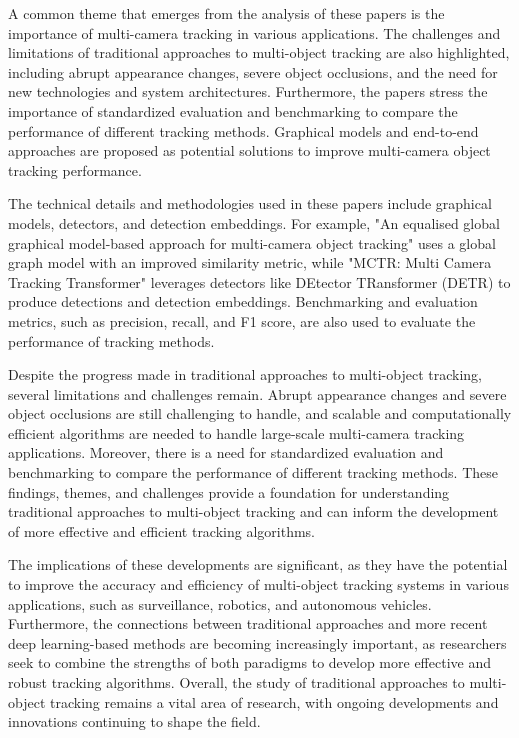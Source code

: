 \documentclass[conference]{IEEEtran}
\begin{document}
A common theme that emerges from the analysis of these papers is the importance of multi-camera tracking in various applications. The challenges and limitations of traditional approaches to multi-object tracking are also highlighted, including abrupt appearance changes, severe object occlusions, and the need for new technologies and system architectures. Furthermore, the papers stress the importance of standardized evaluation and benchmarking to compare the performance of different tracking methods. Graphical models and end-to-end approaches are proposed as potential solutions to improve multi-camera object tracking performance.

The technical details and methodologies used in these papers include graphical models, detectors, and detection embeddings. For example, "An equalised global graphical model-based approach for multi-camera object tracking" \cite{An equalised global graphical model-based approach for multi-camera object tracking} uses a global graph model with an improved similarity metric, while "MCTR: Multi Camera Tracking Transformer" \cite{MCTR: Multi Camera Tracking Transformer} leverages detectors like DEtector TRansformer (DETR) to produce detections and detection embeddings. Benchmarking and evaluation metrics, such as precision, recall, and F1 score, are also used to evaluate the performance of tracking methods.

Despite the progress made in traditional approaches to multi-object tracking, several limitations and challenges remain. Abrupt appearance changes and severe object occlusions are still challenging to handle, and scalable and computationally efficient algorithms are needed to handle large-scale multi-camera tracking applications. Moreover, there is a need for standardized evaluation and benchmarking to compare the performance of different tracking methods. These findings, themes, and challenges provide a foundation for understanding traditional approaches to multi-object tracking and can inform the development of more effective and efficient tracking algorithms.

The implications of these developments are significant, as they have the potential to improve the accuracy and efficiency of multi-object tracking systems in various applications, such as surveillance, robotics, and autonomous vehicles. Furthermore, the connections between traditional approaches and more recent deep learning-based methods are becoming increasingly important, as researchers seek to combine the strengths of both paradigms to develop more effective and robust tracking algorithms. Overall, the study of traditional approaches to multi-object tracking remains a vital area of research, with ongoing developments and innovations continuing to shape the field.
\end{document}
